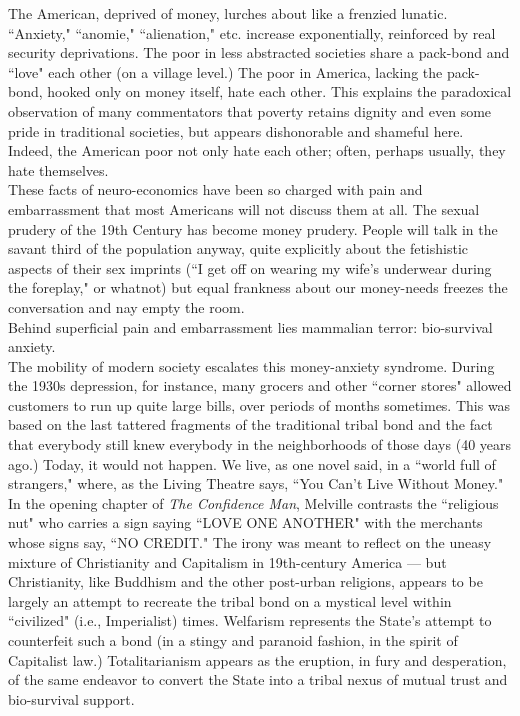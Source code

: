 The American, deprived of money, lurches about like a frenzied lunatic. ``Anxiety," ``anomie," ``alienation," etc. increase exponentially, reinforced by real security deprivations. The poor in less abstracted societies share a pack-bond and ``love" each other (on a village level.) The poor in America, lacking the pack-bond, hooked only on money itself, hate each other. This explains the paradoxical observation of many commentators that poverty retains dignity and even some pride in traditional societies, but appears dishonorable and shameful here. Indeed, the American poor not only hate each other; often, perhaps usually, they hate themselves.\\
These facts of neuro-economics have been so charged with pain and embarrassment that most Americans will not discuss them at all. The sexual prudery of the 19th Century has become money prudery. People will talk in the savant third of the population anyway, quite explicitly about the fetishistic aspects of their sex imprints (``I get off on wearing my wife's underwear during the foreplay," or whatnot) but equal frankness about our money-needs freezes the conversation and nay empty the room.\\
Behind superficial pain and embarrassment lies mammalian terror: bio-survival anxiety.\\
The mobility of modern society escalates this money-anxiety syndrome. During the 1930s depression, for instance,  many grocers and other ``corner stores" allowed customers to run up quite large bills, over periods of months sometimes. This was based on the last tattered fragments of the traditional tribal bond and the fact that everybody still knew everybody in the neighborhoods of those days (40 years ago.) Today, it would not happen. We live, as one novel said, in a ``world full of strangers," where, as the Living Theatre says, ``You Can't Live Without Money."\\
In the opening chapter of \emph{The Confidence Man}, Melville contrasts the ``religious nut" who carries a sign saying ``LOVE ONE ANOTHER" with the merchants whose signs say, ``NO CREDIT." The irony was meant to reflect on the uneasy mixture of Christianity and Capitalism in 19th-century America --- but Christianity, like Buddhism and the other post-urban religions, appears to be largely an attempt to recreate the tribal bond on a mystical level within ``civilized" (i.e., Imperialist) times. Welfarism represents the State's attempt to counterfeit such a bond (in a stingy and paranoid fashion, in the spirit of Capitalist law.) Totalitarianism appears as the eruption, in fury and desperation, of the same endeavor to convert the State into a tribal nexus of mutual trust and bio-survival support.\\

